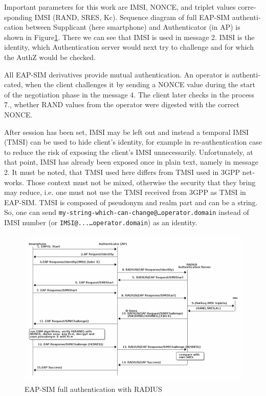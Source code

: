 \documentclass[12pt,a4paper,english]{tutthesis}
\begin{document}
\begin{otherlanguage}{english}
Important parameters for this work are IMSI, NONCE, and triplet values
corresponding IMSI (RAND, SRES, Kc).
Sequence diagram of full EAP-SIM authentication between Supplicant (here
smartphone) and Authenticator (in AP) is shown in
Figure\ref{fig:eap-sim-radius}. 
There we can see that IMSI is used in message 2. IMSI is the
identity, which Authentication server would next try to challenge and
for which the AuthZ would be checked.







All EAP-SIM derivatives provide mutual authentication.
An operator is authenticated, when the client challenges it by sending
a NONCE value during the start of the negotiation phase in the
message 4. The client later checks in the process 7., whether RAND
values from the operator were digested with the correct NONCE.

After session has been set, IMSI may be left out and instead a temporal IMSI
(TMSI) can be used to hide client's identity, for example in
re-authentication case to reduce the risk of exposing the client's
IMSI unnecessarily. Unfortunately, at that point, IMSI has already
been exposed once in plain text, namely in message 2.
It must be noted, that TMSI used here differs from TMSI used in 3GPP
networks. Those context must not be mixed, otherwise the security that
they bring may reduce, i.e. one must not use the TMSI received from
3GPP as TMSI in EAP-SIM.
TMSI is composed of pseudonym and realm part and can be a
string. So, one can send 
\texttt{my-string-which-can-change@…operator.domain} instead of 
IMSI number (or \texttt{IMSI@...…operator.domain}) as an identity. 










\begin{figure}[htb]
\centering
\includegraphics[width=.9\linewidth]{eap-sim-radius.png}
\caption{\label{fig:eap-sim-radius}EAP-SIM full authentication with RADIUS}
\end{figure}

\end{otherlanguage}
\end{document}
